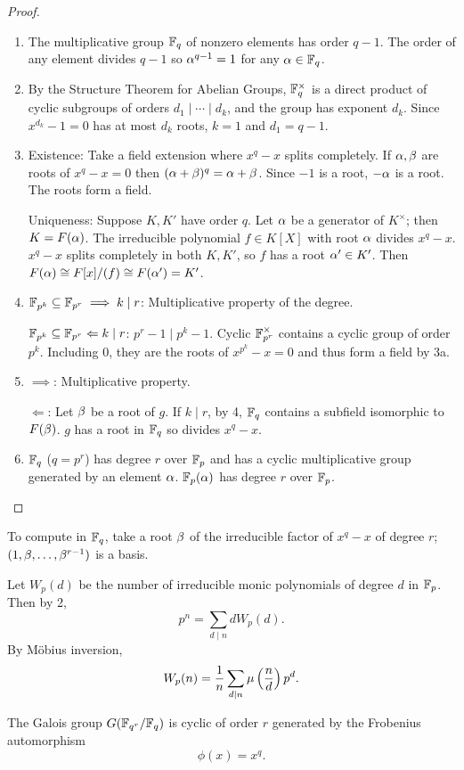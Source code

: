 \begin{proof}
\begin{enumerate}
\item
 The multiplicative group $\mathbb{F}_q$ of nonzero elements has order $q-1$. The order of any element divides $q-1$ so $\alpha^{q-1}=1$ for any $\alpha\in \mathbb{F}_q$.
\item
By the Structure Theorem for Abelian Groups, $\mathbb{F}_q^{\times}$ is a direct product of cyclic subgroups of orders $d_1\mid \cdots \mid d_k$, and the group has exponent $d_k$. Since $x^{d_k}-1=0$ has at most $d_k$ roots, $k=1$ and $d_1=q-1$.
\item
Existence: Take a field extension where $x^q-x$ splits completely. If $\alpha,\beta$ are roots of $x^q-x=0$ then $(\alpha+\beta)^q=\alpha+\beta$. Since $-1$ is a root, $-\alpha$ is a root. The roots form a field.

Uniqueness: Suppose $K,K'$ have order $q$. Let $\alpha$ be a generator of $K^{\times}$; then $K=F(\alpha)$. The irreducible polynomial $f\in K[X]$ with root $\alpha$ divides $x^q-x$. $x^q-x$ splits completely in both $K, K'$, so $f$ has a root $\alpha'\in K'$. Then $F(\alpha)\cong F[x]/(f)\cong F(\alpha')=K'$.
\item $\mathbb{F}_{p^k}\subseteq \mathbb{F}_{p^r}\implies k\mid r$: Multiplicative property of the degree.

$\mathbb{F}_{p^k}\subseteq \mathbb{F}_{p^r}\Leftarrow k\mid r$: $p^r-1\mid p^k-1$. Cyclic $\mathbb{F}_{p^r}^{\times}$ contains a cyclic group of order $p^k$. Including 0, they are the roots of $x^{p^k}-x=0$ and thus form a field by 3a.
\item $\implies$: Multiplicative property.

$\Leftarrow$: Let $\beta$ be a root of $g$. If $k\mid r$, by 4, $\mathbb{F}_q$ contains a subfield isomorphic to $F(\beta)$. $g$ has a root in $\mathbb{F}_q$ so divides $x^q-x$.
\item $\mathbb{F}_q$ ($q=p^r$) has degree $r$ over $\mathbb{F}_p$ and has a cyclic multiplicative group generated by an element $\alpha$. $\mathbb{F}_p(\alpha)$ has degree $r$ over $\mathbb{F}_p$.
\end{enumerate}
\end{proof}
To compute in $\mathbb{F}_q$, take a root $\beta$ of the irreducible factor of $x^q-x$ of degree $r$; $(1,\beta,\ldots, \beta^{r-1})$ is a basis.

Let $W_p(d)$ be the number of irreducible monic polynomials of degree $d$ in $\mathbb{F}_p$. Then by 2,
\[
p^n=\sum_{d\mid n} dW_p(d).
\]
By M\"obius inversion,
\[
W_p(n)=\frac{1}{n} \sum_{d\mid n} \mu\left( {\frac{n}{d}} \right) p^d.
\]
\begin{thm}
The Galois group $G(\mathbb{F}_{q^r}/\mathbb{F}_q)$ is cyclic of order $r$ generated by the Frobenius automorphism
\[
\phi(x)=x^q.
\]
\end{thm}

